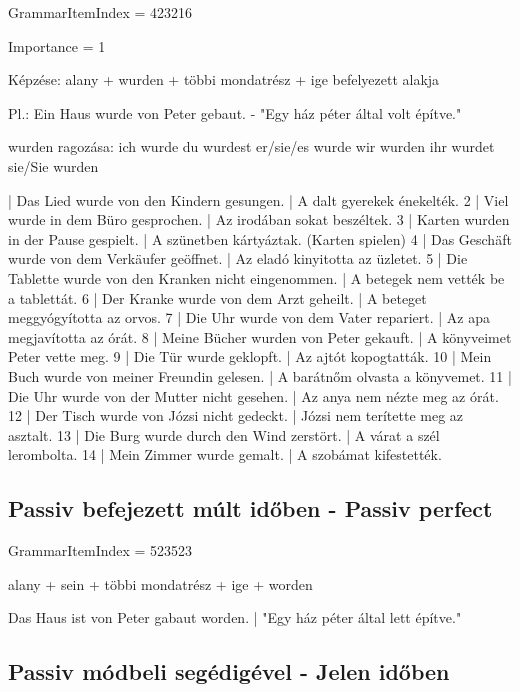 \documentclass{article}
\newenvironment{desc}{\verbatim}{\endverbatim}
\newenvironment{exmp}{\verbatim}{\endverbatim}
\begin{document}
GrammarItemIndex = 423216

Importance = 1

\begin{desc}
Képzése: alany + wurden + többi mondatrész + ige befelyezett alakja

Pl.: Ein Haus wurde von Peter gebaut. - "Egy ház péter által volt építve."

wurden ragozása:
ich wurde
du wurdest
er/sie/es wurde
wir wurden
ihr wurdet
sie/Sie wurden
\end{desc}

\begin{exmp}
1 | Das Lied wurde von den Kindern gesungen. | A dalt gyerekek énekelték.
2 | Viel wurde in dem Büro gesprochen. | Az irodában sokat beszéltek.
3 | Karten wurden in der Pause gespielt. | A szünetben kártyáztak. (Karten spielen)
4 | Das Geschäft wurde von dem Verkäufer geöffnet. | Az eladó kinyitotta az üzletet.
5 | Die Tablette wurde von den Kranken nicht eingenommen. | A betegek nem vették be a tablettát.
6 | Der Kranke wurde von dem Arzt geheilt. | A beteget meggyógyította az orvos.
7 | Die Uhr wurde von dem Vater repariert. | Az apa megjavította az órát.
8 | Meine Bücher wurden von Peter gekauft. | A könyveimet Peter vette meg.
9 | Die Tür wurde geklopft. | Az ajtót kopogtatták.
10 | Mein Buch wurde von meiner Freundin gelesen. | A barátnőm olvasta a könyvemet.
11 | Die Uhr wurde von der Mutter nicht gesehen. | Az anya nem nézte meg az órát.
12 | Der Tisch wurde von Józsi nicht gedeckt. | Józsi nem terítette meg az asztalt.
13 | Die Burg wurde durch den Wind zerstört. | A várat a szél lerombolta.
14 | Mein Zimmer wurde gemalt. | A szobámat kifestették.
\end{exmp}

\subsection{Passiv befejezett múlt időben - Passiv perfect}

GrammarItemIndex = 523523

\begin{desc}
alany + sein + többi mondatrész + ige + worden

Das Haus ist von Peter gabaut worden. | "Egy ház péter által lett építve."
\end{desc}

\subsection{Passiv módbeli segédigével - Jelen időben}
\end{document}
